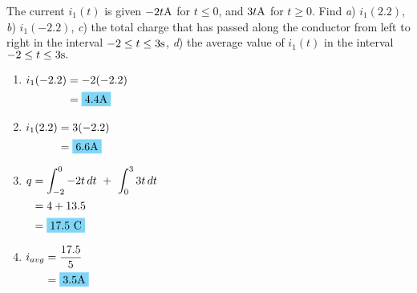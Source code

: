 The current $i_1(t)$ is given $-2t\qw{\A}$ for $t\leq 0$, and $3t\qw{\A}$ for $t\geq 0$.
Find \emph{a}) $i_1(2.2)$, \emph{b}) $i_1(-2.2)$, \emph{c}) the total charge that has passed 
along the conductor from left to right in the interval $-2\leq t \leq 3\si{.\second}$,
\emph{d}) the average value of $i_1(t)$ in the interval $-2\leq t \leq 3\si{.\second}.$

\begin{enumerate}[leftmargin=2cm,labelsep=.5cm,label=\bfseries\alph*)]
	\item $
	\begin{aligned}[t]
	i_1(-2.2)&= -2(-2.2) \\
			 &= \hlbox{4.4\qw{\A}} \\
	\end{aligned} $
	\\[1cm]
	
	\item $
	\begin{aligned}[t]
	i_1(2.2)&= 3(-2.2) \\
			&= \hlbox{6.6\qw{\A}} \\
	\end{aligned} $
	\\[1cm]
	
	\item $
	\begin{aligned}[t]
	q&= \int_{-2}^{0}-2t\,dt\ +\ \int_{0}^{3}3t\,dt \\
	 &= 4+13.5 \\
	 &= \hlbox{17.5\text{ C}} \\	
	\end{aligned} $
	\\[1cm]
	
	\item $
	\begin{aligned}[t]
	i_{avg} &= \frac{17.5}{5} \\
		  &= \hlbox{3.5\qw{\A}} \\
	\end{aligned} $
	\\[1cm]
\end{enumerate}